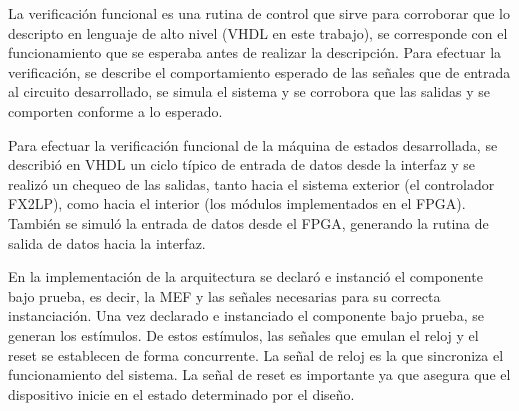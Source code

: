 La verificación funcional es una rutina de control que sirve para corroborar que lo descripto en lenguaje de alto nivel (VHDL en este trabajo), se corresponde con el funcionamiento que se esperaba antes de realizar la descripción. Para efectuar la verificación, se describe el comportamiento esperado de las señales que de entrada al circuito desarrollado, se simula el sistema y se corrobora que las salidas y se comporten conforme a lo esperado.

Para efectuar la verificación funcional de la máquina de estados desarrollada, se describió en VHDL un ciclo típico de entrada de datos desde la interfaz y se realizó un chequeo de las salidas, tanto hacia el sistema exterior (el controlador FX2LP), como hacia el interior (los módulos implementados en el FPGA). También se simuló la entrada de datos desde el FPGA, generando la rutina de salida de datos hacia la interfaz.

%

En la implementación de la arquitectura se declaró e instanció el componente bajo prueba, es decir, la MEF y las señales necesarias para su correcta instanciación.
Una vez declarado e instanciado el componente bajo prueba, se generan los estímulos. De estos estímulos, las señales que emulan el reloj y el reset se establecen de forma concurrente. La señal de reloj es la que sincroniza el funcionamiento del sistema. La señal de reset es importante ya que asegura que el dispositivo inicie en el estado determinado por el diseño. 

